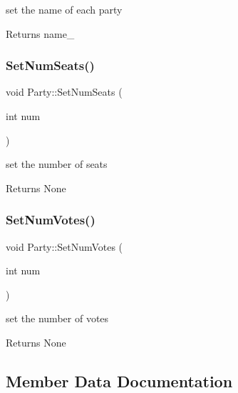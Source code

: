 set the name of each party 

\begin{DoxyReturn}{Returns}
name\+\_\+ 
\end{DoxyReturn}
\mbox{\label{classParty_ae7523a0a047e5a6ffac376331ea11ded}} 
\subsubsection{\texorpdfstring{Set\+Num\+Seats()}{SetNumSeats()}}
{\footnotesize\ttfamily void Party\+::\+Set\+Num\+Seats (\begin{DoxyParamCaption}\item[{int}]{num }\end{DoxyParamCaption})}



set the number of seats 

\begin{DoxyReturn}{Returns}
None 
\end{DoxyReturn}
\mbox{\label{classParty_a60b1e5933f9f61cd8b9bd21b2c66f633}} 
\subsubsection{\texorpdfstring{Set\+Num\+Votes()}{SetNumVotes()}}
{\footnotesize\ttfamily void Party\+::\+Set\+Num\+Votes (\begin{DoxyParamCaption}\item[{int}]{num }\end{DoxyParamCaption})}



set the number of votes 

\begin{DoxyReturn}{Returns}
None 
\end{DoxyReturn}


\subsection{Member Data Documentation}
\mbox{\label{classParty_a4d41ca10218671ecbc17ca75c4010822}} 
